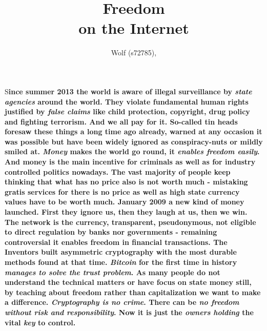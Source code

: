 \documentclass[DIV=calc, BCOR=5mm, paper=a4, fontsize=11pt, twocolumn]{scrartcl}	 %
\title{Freedom \\
on the Internet} %
\author{Wolf (s72785), } %
\date{} %
\newcommand{\initial}[1]{ %
\lettrine[lines=3,lhang=0.3,nindent=0em]{
\color{DarkGoldenrod}
{\textsf{#1}}}{}}
\begin{document}
\maketitle %

\thispagestyle{fancy} %



\begin{onehalfspace}

\initial{S}\textbf{ince summer 2013 the world is aware of illegal surveillance by \textit{state agencies} around the world. They violate fundamental human rights justified by \textit{false claims} like child protection, copyright, drug policy and fighting terrorism. And we all pay for it. So-called tin heads foresaw these things a long time ago already, warned at any occasion it was possible but have been widely ignored as conspiracy-nuts or mildly smiled at. \textit{Money} makes the world go round, it \textit{enables freedom easily}. And money is the main incentive for criminals as well as for industry controlled politics nowadays. The vast majority of people keep thinking that what has no price also is not worth much - mistaking gratis services for there is no price as well as high state currency values have to be worth much. January 2009 a new kind of money launched. First they ignore us, then they laugh at us, then we win. The network is the currency, transparent, pseudonymous, not eligible to direct regulation by banks nor governments - remaining controversial it enables freedom in financial transactions. The Inventors built asymmetric cryptography with the most durable methods found at that time. \textit{Bitcoin} for the first time in history \textit{manages to solve the trust problem}. As many people do not understand the technical matters or have focus on state money still, by teaching about freedom rather than capitalization we want to make a difference. \textit{Cryptography is no crime}. There can be \textit{no freedom without risk and responsibility}. Now it is just the \textit{owners holding} the vital \textit{key} to control. }


\end{onehalfspace}


\end{document}
